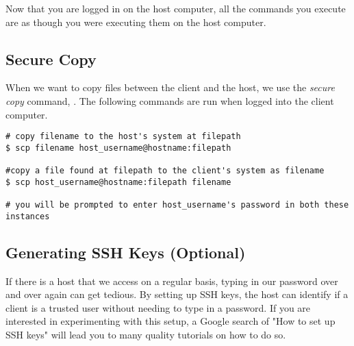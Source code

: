 Now that you are logged in on the host computer, all the commands you execute are as though you were executing them on the host computer.

\subsection*{Secure Copy} %

When we want to copy files between the client and the host, we use the \emph{secure copy} command, .
The following commands are run when logged into the client computer.

\begin{lstlisting}
# copy filename to the host's system at filepath
$ scp filename host_username@hostname:filepath

#copy a file found at filepath to the client's system as filename
$ scp host_username@hostname:filepath filename

# you will be prompted to enter host_username's password in both these instances
\end{lstlisting}

\begin{comment}
\begin{problem}
You will either need a partner for this problem or have access to a username on another computer.
Experiment with SSH. Verify that you can connect from a client to a host.
Copy a few files between the host and the client.
\end{problem}
\end{comment}

\subsection*{Generating SSH Keys (Optional)} %

If there is a host that we access on a regular basis, typing in our password over and over again can get tedious.
By setting up SSH keys, the host can identify if a client is a trusted user without needing to type in a password.
If you are interested in experimenting with this setup, a Google search of "How to set up SSH keys" will lead you to many quality tutorials on how to do so.
